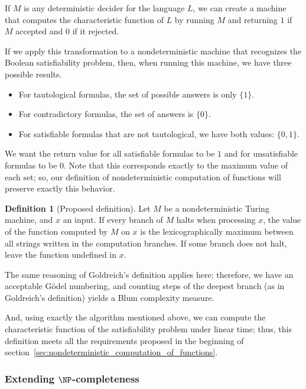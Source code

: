 \documentclass[12pt]{article}
\theoremstyle{definition}
\newtheorem{definition}{Definition}
\begin{document}
If $M$ is any deterministic decider for the language $L$,
we can create a machine that computes the characteristic function of $L$
by running $M$ and returning $1$ if $M$ accepted and $0$ if it rejected.

If we apply this transformation to a nondeterministic machine
that recognizes the Boolean satisfiability problem,
then, when running this machine,
we have three possible results.
\begin{itemize}
    \item For tautological formulas,
        the set of possible answers is only $\{1\}$.
    \item For contradictory formulas,
        the set of answers is $\{0\}$.
    \item For satisfiable formulas that are not tautological,
        we have both values: $\{0, 1\}$.
\end{itemize}
We want the return value for all satisfiable formulas to be $1$
and for unsatisfiable formulas to be $0$.
Note that this corresponds exactly to the maximum value of each set;
so,
our definition of nondeterministic computation of functions
will preserve exactly this behavior.

\begin{definition}[Proposed definition]
    Let $M$ be a nondeterministic Turing machine,
    and $x$ an input.
    If every branch of $M$ halts when processing $x$,
    the value of the function computed by $M$ on $x$
    is the lexicographically maximum
    between all strings written in the computation branches.
    If some branch does not halt, leave the function undefined in $x$.
\end{definition}

The same reasoning of Goldreich's definition applies here;
therefore, we have an acceptable Gödel numbering,
and counting steps of the deepest branch
(as in Goldreich's definition)
yields a Blum complexity measure.

And, using exactly the algorithm mentioned above,
we can compute the characteristic function of the satisfiability problem
under linear time;
thus, this definition meets all the requirements
proposed in the beginning of section~\ref{sec:nondeterministic_computation_of_functions}.

\vspace{-12pt}
\subsubsection{Extending $\NP$-completeness}
\label{sec:np-completeness-extension}
\end{document}
